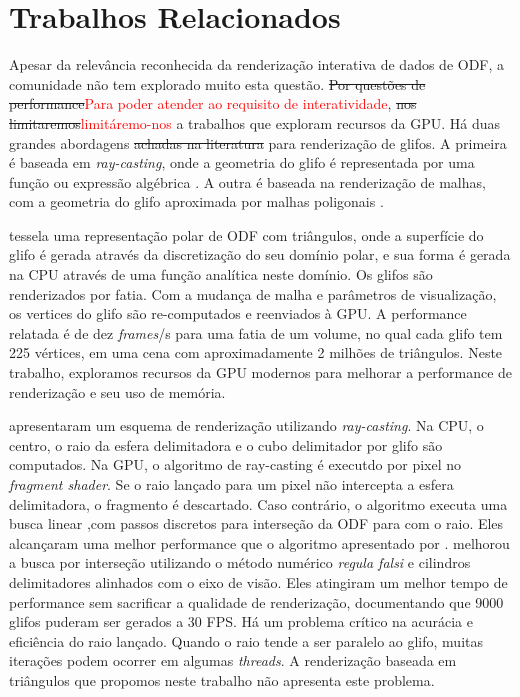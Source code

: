 \section{Trabalhos Relacionados}
\label{sec::trabalhos_relacionados}

Apesar da relevância reconhecida da renderização interativa de dados de ODF, a comunidade não tem explorado muito esta questão. \sout{Por questões de performance}\textcolor{red}{Para poder atender ao requisito de interatividade}, \sout{nos limitaremos}\textcolor{red}{limitáremo-nos} a trabalhos que exploram recursos da GPU. Há duas grandes abordagens \sout{achadas na literatura} para renderização de glifos. A primeira é baseada em \textit{ray-casting}, onde a geometria do glifo é representada por uma função ou expressão algébrica \cite{peeters2009, almsick2011}. A outra é baseada na renderização de malhas, com a geometria do glifo aproximada por malhas poligonais \cite{shattuck2008}.


 tessela uma representação polar de ODF com triângulos, onde a superfície do glifo é gerada através da discretização do seu domínio polar, e sua forma é gerada na CPU através de uma função analítica neste domínio. Os glifos são renderizados por fatia. Com a mudança de malha e parâmetros de visualização, os vertices do glifo são re-computados e reenviados à GPU. A performance relatada é de dez \textit{frames}/s para uma fatia de um volume, no qual cada glifo tem 225 vértices, em uma cena com aproximadamente 2 milhões de triângulos. Neste trabalho, exploramos recursos da GPU modernos para melhorar a performance de renderização e seu uso de memória.


 apresentaram um esquema de renderização utilizando \textit{ray-casting}. Na CPU, o centro, o raio da esfera delimitadora e o cubo delimitador por glifo são computados. Na GPU, o algoritmo de ray-casting é executdo por pixel no \textit{fragment shader}. Se o raio lançado para um pixel não intercepta a esfera delimitadora, o fragmento é descartado. Caso contrário, o algoritmo executa uma busca linear ,com passos discretos para interseção da ODF para com o raio. Eles alcançaram uma melhor performance que o algoritmo apresentado por .  melhorou a busca por interseção utilizando o método numérico \textit{regula falsi} e cilindros delimitadores alinhados com o eixo de visão. Eles atingiram um melhor tempo de performance sem sacrificar a qualidade de renderização, documentando que 9000 glifos puderam ser gerados a 30 FPS. Há um problema crítico na acurácia e eficiência do raio lançado. Quando o raio tende a ser paralelo ao glifo, muitas iterações podem ocorrer em algumas \textit{threads}. A renderização baseada em triângulos que propomos neste trabalho não apresenta este problema. 

